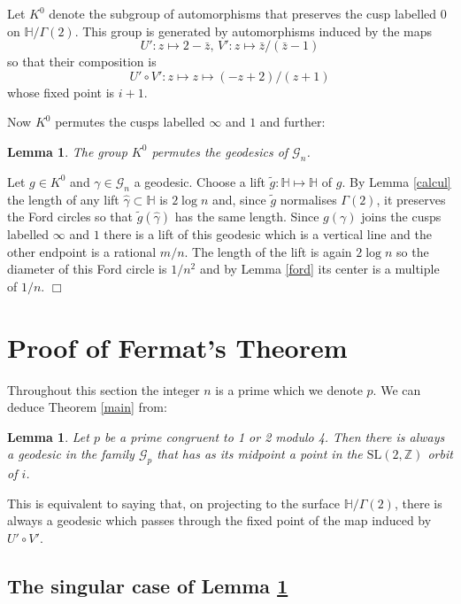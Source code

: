 \documentclass[12pt,a4paper]{amsart}
\newtheorem{lem}[thm]{Lemma}
\def\HH{\mathbb{H}}
\def\xx{\HH/g2}
\def\ZZ{\mathbb{Z}}
\def\sl2{\mathrm{SL}(2, \ZZ)}
\def\g2{\Gamma(2)}
\def\xx{\HH/\g2}
\def\gg{\mathcal{G}_n}
\def\ggp{\mathcal{G}_p}
\begin{document}
Let  $K^0$ denote 
the subgroup of automorphisms 
that preserves the cusp labelled $0$ on $\xx$.
This group is generated by  automorphisms induced by the maps
$$U': z \mapsto 2-\bar{z},\, V' : z \mapsto \bar{z}/(\bar{z} - 1)$$
so that  their composition is 
$$U'\circ V' : z \mapsto z \mapsto (-z + 2) /( z + 1)$$
whose fixed point is $i+1$.


Now $K^0$ permutes the cusps labelled $\infty$ and $1$
and further:

\begin{lem} \label{action}
 The group $K^0$  permutes the geodesics of $\gg$.
\end{lem}
\proof
Let $g \in K^0$ and $\gamma \in \gg$ a geodesic.
Choose a lift $\tilde{g} : \HH \mapsto \HH$ of $g$.
By Lemma  \ref{calcul} the  length of any lift  $\hat{\gamma} \subset \HH$ is $2\log n$
and, since $\tilde{g}$ normalises $\g2$, it preserves the Ford circles
so that  $\tilde{g}(\hat{\gamma})$ has the same length.
Since $g(\gamma)$ joins the cusps labelled $\infty$ and $1$
there is a lift of this geodesic which is a vertical line
 and the other endpoint is a rational $m/n$.
The length of the lift  is again $2 \log n$ so
the diameter of this  Ford circle is $1/n^2$
and by Lemma \ref{ford} its center is a multiple of $1/n$.
\hfill $\Box$


 
 \section{Proof of Fermat's Theorem}

Throughout this section the integer $n$ is a prime which we denote $p$.
We can deduce Theorem \ref{main} from:

\begin{lem} \label{midpoint}
Let $p$ be a prime congruent to 1 or 2 modulo 4.
Then there is always a geodesic 
in the family $\ggp$
 that has as its  midpoint a point in the $\sl2$  orbit of $i$.
\end{lem}


This is equivalent to saying that, 
on projecting to the surface  $\xx$,
 there  is always a geodesic which passes through
the  fixed point of the map induced by $U'\circ V'$.

\subsection{The singular case of Lemma \ref{midpoint}}
\end{document}
